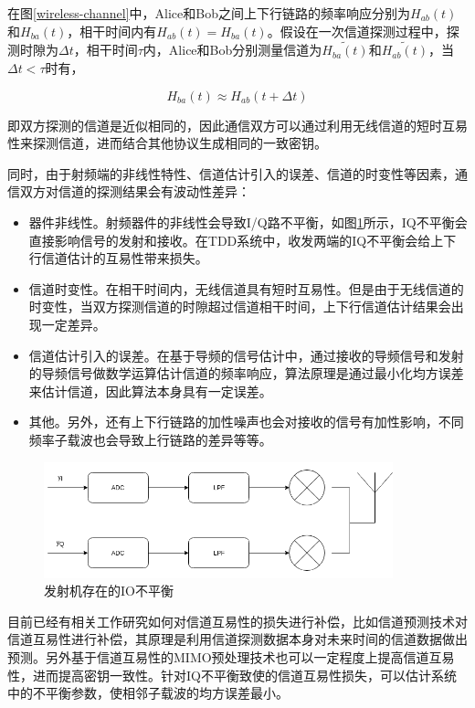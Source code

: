\documentclass[master]{seuthesis} %
\begin{document}
\begin{Main}
在图\ref{wireless-channel}中，Alice和Bob之间上下行链路的频率响应分别为$H_{ab}(t)$和$H_{ba}(t)$，相干时间内有$H_{ab}(t) = H_{ba}(t)$。假设在一次信道探测过程中，探测时隙为$\Delta t$，相干时间$\tau$内，Alice和Bob分别测量信道为$\tilde{H_{ba}(t)}$和$\tilde{H_{ab}(t)}$，当$ \Delta t < \tau $时有，

\begin{equation}
    H_{ba}(t) \approx H_{ab}(t + \Delta t)
\end{equation}

即双方探测的信道是近似相同的，因此通信双方可以通过利用无线信道的短时互易性来探测信道，进而结合其他协议生成相同的一致密钥。

同时，由于射频端的非线性特性、信道估计引入的误差、信道的时变性等因素\cite{guillaud2005practical}，通信双方对信道的探测结果会有波动性差异：

\begin{itemize}
    \item 器件非线性。射频器件的非线性会导致I/Q路不平衡，如图\ref{iq_imbalance}所示，IQ不平衡会直接影响信号的发射和接收。在TDD系统中，收发两端的IQ不平衡会给上下行信道估计的互易性带来损失。
    \item 信道时变性。在相干时间内，无线信道具有短时互易性。但是由于无线信道的时变性，当双方探测信道的时隙超过信道相干时间，上下行信道估计结果会出现一定差异。
    \item 信道估计引入的误差。在基于导频的信号估计中，通过接收的导频信号和发射的导频信号做数学运算估计信道的频率响应，算法原理是通过最小化均方误差来估计信道，因此算法本身具有一定误差。
    \item 其他。另外，还有上下行链路的加性噪声也会对接收的信号有加性影响，不同频率子载波也会导致上行链路的差异等等。
\end{itemize}

\begin{figure}[htbp!]
    \centering \includegraphics[width=0.9\textwidth]{images/iq_imbalance} 
    \caption{发射机存在的IO不平衡}
    \label{iq_imbalance}
\end{figure}


目前已经有相关工作研究如何对信道互易性的损失进行补偿，比如信道预测技术对信道互易性进行补偿，其原理是利用信道探测数据本身对未来时间的信道数据做出预测\cite{heidari2010adaptive}。另外基于信道互易性的MIMO预处理技术也可以一定程度上提高信道互易性，进而提高密钥一致性。针对IQ不平衡致使的信道互易性损失，可以估计系统中的不平衡参数，使相邻子载波的均方误差最小\cite{tubbax2005compensation}。


\end{Main}
\end{document}
